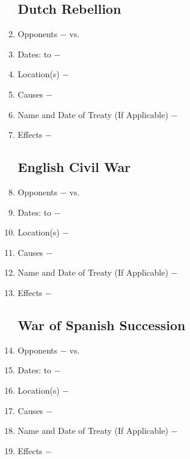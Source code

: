 \documentclass[12pt]{article}
\begin{document}
\begin{enumerate}
\subsection{Dutch Rebellion}

\item Opponents $-$ vs.

\item Dates: to $-$

\item Location(s) $-$ 

\item Causes $-$

\item Name and Date of Treaty (If Applicable) $-$ 

\item Effects $-$ 

\subsection{English Civil War}

\item Opponents $-$ vs.

\item Dates: to $-$

\item Location(s) $-$ 

\item Causes $-$

\item Name and Date of Treaty (If Applicable) $-$ 

\item Effects $-$ 

\subsection{War of Spanish Succession}
 
\item Opponents $-$ vs.

\item Dates: to $-$

\item Location(s) $-$ 

\item Causes $-$

\item Name and Date of Treaty (If Applicable) $-$ 

\item Effects $-$ 


\end{enumerate}
\end{document}
